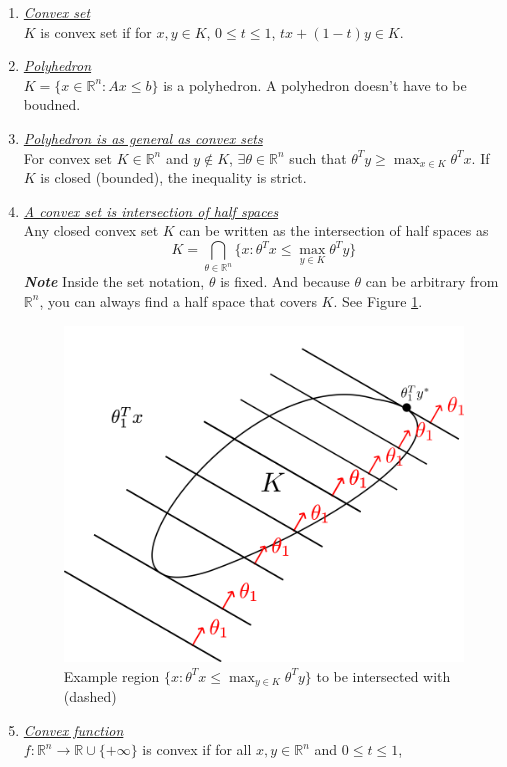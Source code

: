 \documentclass[12pt]{article}
\newcommand{\istart}[1]{\underline{\textit{#1}}\\}
\newcommand{\idetail}[1]{\footnotesize\textbf{\emph{#1}}\normalsize}
\newcommand{\mapto}{\rightarrow}
\newcommand{\bR}{\mathbb{R}}
\begin{document}
\begin{enumerate}
  \item \istart{Convex set} $K$ is convex set if for $x,y\in K$, $0\leq t\leq 1$, $tx+(1-t)y\in K$.
  \item \istart{Polyhedron} $K=\{x\in\bR^n: Ax\leq b\}$ is a polyhedron. A polyhedron doesn't have to be boudned.
  \item \istart{Polyhedron is as general as convex sets}
    For convex set $K\in\bR^n$ and $y\notin K$, $\exists \theta\in\bR^n$ such that $\theta^Ty\geq\max_{x\in K}\theta^Tx$. If $K$ is closed (bounded), the inequality is strict.
  \item \istart{A convex set is intersection of half spaces} Any closed convex set $K$ can be written as the intersection of half spaces as
    \[
      K = \bigcap_{\theta\in\bR^n}\{x: \theta^Tx \leq \max_{y\in K} \theta^Ty\}
     \]
    \idetail{Note} Inside the set notation, $\theta$ is fixed. And because $\theta$ can be arbitrary from $\bR^n$, you can always find a half space that covers $K$. See Figure \ref{fig:halfspace}.
    \begin{figure}[h]
      \centering
      \includegraphics[scale=1]{figs/halfspace}
      \caption{Example region $\{x: \theta^Tx\leq\max_{y\in K}\theta^Ty\}$ to be intersected with (dashed)}
      \label{fig:halfspace}
    \end{figure}    
  \item \istart{Convex function} $f:\bR^n\mapto\bR\cup\{+\infty\}$ is convex if for all $x,y\in\bR^n$ and $0\leq t\leq 1$,

\end{enumerate}
\end{document}

